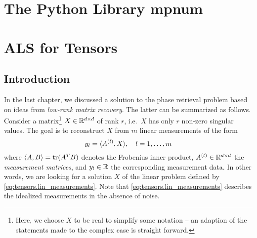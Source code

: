 





\section{The Python Library mpnum}%
\label{sec:tensors.mpnum}


\section{ALS for Tensors}%
\label{sec:tensors.als}

\subsection{Introduction}
\label{sub:tensors.als.introduction}

In the last chapter, we discussed a solution to the phase retrieval problem based on ideas from \emph{low-rank matrix recovery}.
The latter can be summarized as follows.
Consider a matrix\footnote{%
  Here, we choose $X$ to be real to simplify some notation -- an adaption of the statements made to the complex case is straight forward.
}
$X \in {\mathbb{R}}^{d \times d}$ of rank $r$, i.e.\ $X$ has only $r$ non-zero singular values.
The goal is to reconstruct $X$ from $m$ linear measurements of the form
\[
  y_l = {\braket{A^{(l)}, X}}, \quad l=1,\ldots,m
  \label{eq:tensors.lin_measurements}
\]
where $\braket{A, B} = \operatorname{tr} ({{A}^T} B)$ denotes the Frobenius inner product, $A^{(l)} \in {\mathbb{R}}^{d \times d}$ the \emph{measurement matrices}, and $y_l \in {\mathbb{R}}$ the corresponding measurement data.
In other words, we are looking for a solution $X$ of the linear problem defined by \cref{eq:tensors.lin_measurements}.
Note that \cref{eq:tensors.lin_measurements} describes the idealized measurements in the absence of noise.

